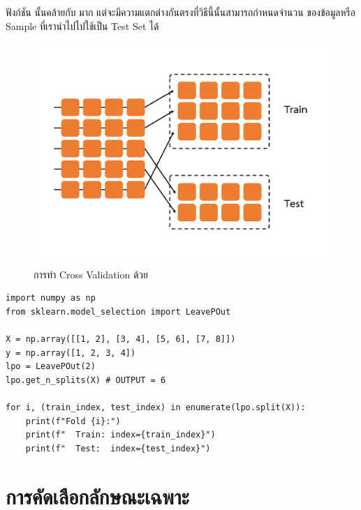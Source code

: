 ฟังก์ชัน  นั้นคล้ายกับ  มาก แต่จะมีความแตกต่างกันตรงที่วิธีนี้นั้นสามารถกำหนดจำนวน%
ของข้อมูลหรือ Sample ที่เรานำไปไปใช้เป็น Test Set ได้

\begin{figure}[H]
    \centering
    \includegraphics[width=0.9\linewidth,page=6]{fig/cross_validation.pdf}
    \caption{การทำ Cross Validation ด้วย }
    \label{fig:leave_p_out}
\end{figure}

\begin{lstlisting}[style=MyPython]
import numpy as np
from sklearn.model_selection import LeavePOut

X = np.array([[1, 2], [3, 4], [5, 6], [7, 8]])
y = np.array([1, 2, 3, 4])
lpo = LeavePOut(2)
lpo.get_n_splits(X) # OUTPUT = 6

for i, (train_index, test_index) in enumerate(lpo.split(X)):
    print(f"Fold {i}:")
    print(f"  Train: index={train_index}")
    print(f"  Test:  index={test_index}")
\end{lstlisting}

\section{การคัดเลือกลักษณะเฉพาะ}
\label{sec:select_feat}

